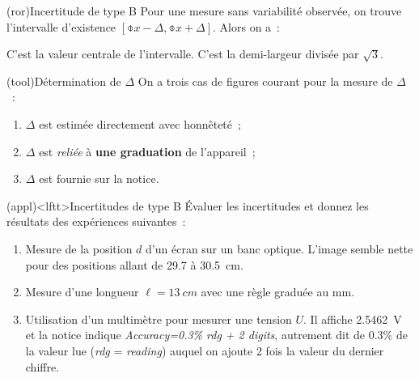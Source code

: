\documentclass[../../main/main.tex]{subfiles}
\begin{document}
\begin{tcb*}(ror){Incertitude de type B}
	Pour une mesure sans variabilité observée, on trouve l'intervalle d'existence
	$[\obar{x} - \Delta, \obar{x} + \Delta]$. Alors on a~:
	\smallbreak
	\begin{isd}[cnt, sidebyside align=top]
		C'est la valeur centrale de l'intervalle.
		\psw{%
			\[
				\boxed{x\ind{exp} = \obar{x}}
			\]
		}%
		\vspace{-15pt}
		\tcblower
		C'est la demi-largeur divisée par $\sqrt{3}$.
		\psw{%
			\[
				\boxed{u(x\ind{exp}) = \frac{\Delta}{\sqrt{3}}}
			\]
		}%
		\vspace{-15pt}
	\end{isd}
\end{tcb*}

\begin{tcb}(tool){Détermination de $\Delta$}
	On a trois cas de figures courant pour la mesure de $\Delta$~:
	\begin{enumerate}
		\item $\Delta$ est estimée directement avec honnêteté~;
		\item $\Delta$ est \textit{reliée} à \textbf{une graduation} de l'appareil~;
		\item $\Delta$ est fournie sur la notice.
	\end{enumerate}
\end{tcb}

\begin{tcb*}(appl)<lftt>{Incertitudes de type B}
	Évaluer les incertitudes et donnez les résultats des expériences suivantes~:
	\begin{enumerate}
		\item Mesure de la position $d$ d'un écran sur un banc optique. L'image
		      semble nette pour des positions allant de \num{29.7} à \SI{30.5}{cm}.
		      \smallbreak
		      \vspace*{-20pt}
		\item Mesure d'une longueur $\ell = \SI{13}{cm}$ avec une règle graduée au
		      \si{mm}.
		      \smallbreak
		      \vspace*{-20pt}
		\item Utilisation d'un multimètre pour mesurer une tension $U$. Il affiche
		      \SI{2.5462}{V} et la notice indique \textit{Accuracy=0.3\% rdg + 2
			      digits}, autrement dit de \num{0.3}\% de la valeur lue (\textit{rdg}
		      = \textit{reading}) auquel on ajoute 2 fois la valeur du dernier
		      chiffre.
		      \smallbreak
		      \vspace*{-20pt}
	\end{enumerate}
\end{tcb*}
\end{document}
